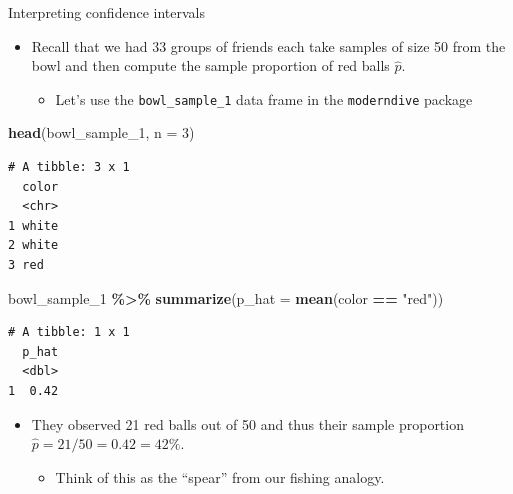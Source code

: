 \documentclass[
  ignorenonframetext,
]{beamer}
\newenvironment{Shaded}{\begin{snugshade}}{\end{snugshade}}
\newcommand{\AttributeTok}[1]{\textcolor[rgb]{0.13,0.29,0.53}{#1}}
\newcommand{\DecValTok}[1]{\textcolor[rgb]{0.00,0.00,0.81}{#1}}
\newcommand{\FunctionTok}[1]{\textcolor[rgb]{0.13,0.29,0.53}{\textbf{#1}}}
\newcommand{\NormalTok}[1]{#1}
\newcommand{\SpecialCharTok}[1]{\textcolor[rgb]{0.81,0.36,0.00}{\textbf{#1}}}
\newcommand{\StringTok}[1]{\textcolor[rgb]{0.31,0.60,0.02}{#1}}
\providecommand{\tightlist}{%
  \setlength{\itemsep}{0pt}\setlength{\parskip}{0pt}}
\begin{document}
\begin{frame}[fragile]{Interpreting confidence intervals}
\label{interpreting-confidence-intervals-3}
\begin{itemize}
\item
  Recall that we had 33 groups of friends each take samples of size 50
  from the bowl and then compute the sample proportion of red balls
  \(\hat{p}\).

  \begin{itemize}
  \tightlist
  \item
    Let's use the \texttt{bowl\_sample\_1} data frame in the
    \texttt{moderndive} package
  \end{itemize}
\end{itemize}

\small

\begin{Shaded}
\begin{Highlighting}[]
\FunctionTok{head}\NormalTok{(bowl\_sample\_1, }\AttributeTok{n =} \DecValTok{3}\NormalTok{)}
\end{Highlighting}
\end{Shaded}

\begin{verbatim}
# A tibble: 3 x 1
  color
  <chr>
1 white
2 white
3 red  
\end{verbatim}

\begin{Shaded}
\begin{Highlighting}[]
\NormalTok{bowl\_sample\_1 }\SpecialCharTok{\%\textgreater{}\%} 
  \FunctionTok{summarize}\NormalTok{(}\AttributeTok{p\_hat =} \FunctionTok{mean}\NormalTok{(color }\SpecialCharTok{==} \StringTok{"red"}\NormalTok{))}
\end{Highlighting}
\end{Shaded}

\begin{verbatim}
# A tibble: 1 x 1
  p_hat
  <dbl>
1  0.42
\end{verbatim}

\normalsize

\begin{itemize}
\item
  They observed 21 red balls out of 50 and thus their sample proportion
  \(\hat{p}=21/50 = 0.42 = 42\%\).

  \begin{itemize}
  \tightlist
  \item
    Think of this as the ``spear'' from our fishing analogy.
  \end{itemize}
\end{itemize}
\end{frame}
\end{document}
